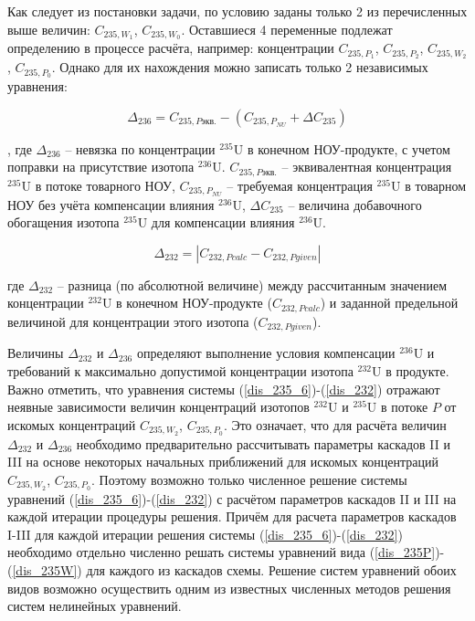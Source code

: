 Как следует из постановки задачи, по условию заданы только 2 из перечисленных выше величин: $C_{235,{W_1}}$, $C_{235,{W_0}}$. Оставшиеся 4 переменные подлежат определению в процессе расчёта, например: концентрации $C_{235,{P_1}}$, $C_{235,{P_2}}$, $C_{235,{W_2}}$, $C_{235,{P_0}}$. Однако для их нахождения можно записать только 2 независимых уравнения:  

\begin{equation}
    \label{dis_235_6}
    \Delta_{236}=C_{235,P\textit{экв.}}-(C_{235,{P_{NU}}}+\Delta C_{235})
\end{equation}

, где $\Delta_{236}$ -- невязка по концентрации $^{235}$U в конечном НОУ-продукте, с учетом поправки на присутствие изотопа $^{236}$U. $C_{235,P\textit{экв.}}$ -- эквивалентная концентрация $^{235}$U в потоке товарного НОУ, $C_{235,{P_{NU}}}$ -- требуемая концентрация $^{235}$U в товарном НОУ без учёта компенсации влияния $^{236}$U, $\Delta C_{235}$ -- величина добавочного обогащения изотопа $^{235}$U для компенсации влияния $^{236}$U. 

\begin{equation}
\label{dis_232}
\Delta_{232}=\left|C_{232,P\textit{calc}}-C_{232,P\textit{given}}\right|
\end{equation}

где $\Delta_{232}$ -- разница (по абсолютной величине) между рассчитанным значением концентрации $^{232}$U в конечном НОУ-продукте ($C_{232,P\textit{calc}}$) и заданной предельной величиной для концентрации этого изотопа ($C_{232,P\textit{given}}$).

Величины $\Delta_{232}$ и $\Delta_{236}$ определяют выполнение условия компенсации $^{236}$U и требований к максимально допустимой концентрации изотопа $^{232}$U в продукте. Важно отметить, что уравнения системы (\ref{dis_235_6})-(\ref{dis_232}) отражают неявные зависимости величин концентраций изотопов $^{232}$U и $^{235}$U в потоке $P$ от искомых концентраций $C_{235,{W_2}}$, $C_{235,{P_0}}$. Это означает, что для расчёта величин $\Delta_{232}$ и $\Delta_{236}$ необходимо предварительно рассчитывать параметры каскадов II и III на основе некоторых начальных приближений для искомых концентраций $C_{235,{W_2}}$, $C_{235,{P_0}}$. Поэтому возможно только численное решение системы уравнений (\ref{dis_235_6})-(\ref{dis_232}) с расчётом параметров каскадов II и III на каждой итерации процедуры решения. Причём для расчета параметров каскадов I-III для каждой итерации решения системы (\ref{dis_235_6})-(\ref{dis_232}) необходимо отдельно численно решать системы уравнений вида (\ref{dis_235P})-(\ref{dis_235W}) для каждого из каскадов схемы. Решение систем уравнений обоих видов возможно осуществить одним из известных численных методов решения систем нелинейных уравнений. 

